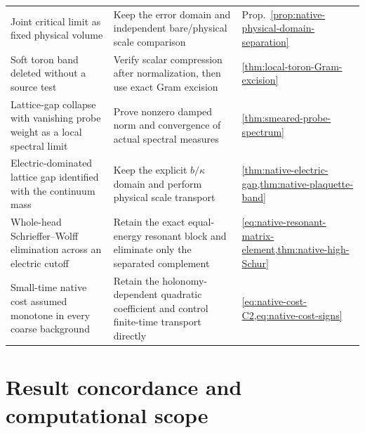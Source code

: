 \documentclass[11pt,oneside,openany]{book}
\theoremstyle{definition}
\theoremstyle{remark}
\begin{document}
\begin{longtable}{L{0.24\textwidth}L{0.49\textwidth}L{0.17\textwidth}}
Joint critical limit as fixed physical volume & Keep the error domain and independent bare/physical scale comparison & Prop.~\ref{prop:native-physical-domain-separation} \\
Soft toron band deleted without a source test & Verify scalar compression after normalization, then use exact Gram excision & \cref{thm:local-toron-Gram-excision} \\
Lattice-gap collapse with vanishing probe weight as a local spectral limit & Prove nonzero damped norm and convergence of actual spectral measures & \cref{thm:smeared-probe-spectrum} \\
Electric-dominated lattice gap identified with the continuum mass & Keep the explicit $b/\kappa$ domain and perform physical scale transport & \cref{thm:native-electric-gap,thm:native-plaquette-band} \\
Whole-head Schrieffer--Wolff elimination across an electric cutoff & Retain the exact equal-energy resonant block and eliminate only the separated complement & \cref{eq:native-resonant-matrix-element,thm:native-high-Schur} \\
Small-time native cost assumed monotone in every coarse background & Retain the holonomy-dependent quadratic coefficient and control finite-time transport directly & \cref{eq:native-cost-C2,eq:native-cost-signs} \\
\bottomrule
\end{longtable}

\chapter{Result concordance and computational scope}
\label{app:concordance}
\end{document}
